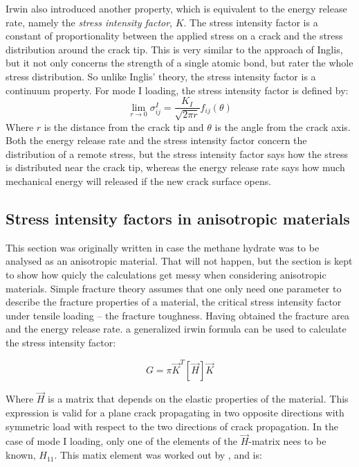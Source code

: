 Irwin also introduced another property, which is equivalent to the energy release rate, namely the \emph{stress intensity factor}, $K$. The stress intensity factor is a constant of proportionality between the applied stress on a crack and the stress distribution around the crack tip. This is very similar to the approach of Inglis, but it not only concerns the strength of a single atomic bond, but rater the whole stress distribution. So unlike Inglis' theory, the stress intensity factor is a continuum property. For mode I loading, the stress intensity factor is defined by:
\begin{equation}
	\lim_{r \to 0} \sigma_{ij}^I = \frac{K_I}{\sqrt{2\pi r}} f_{ij}(\theta)
\end{equation}
Where $r$ is the distance from the crack tip and $\theta$ is the angle from the crack axis. Both the energy release rate and the stress intensity factor concern the distribution of a remote stress, but the stress intensity factor says how the stress is distributed near the crack tip, whereas the energy release rate says how much mechanical energy will released if the new crack surface opens. 

\subsection{Stress intensity factors in anisotropic materials}
This section was originally written in case the methane hydrate was to be analysed as an anisotropic material. That will not happen, but the section is kept to show how quicly the calculations get messy when considering anisotropic materials. Simple fracture theory assumes that one only need one parameter to describe the fracture properties of a material, the critical stress intensity factor under tensile loading -- the fracture toughness. Having obtained the fracture area and the energy release rate. a generalized irwin formula can be used to calculate the stress intensity factor:

\begin{equation}
	G = \pi \vec{K}^T [\vec{H}] \vec{K} 
\end{equation}


Where $\vec{H}$ is a matrix that depends on the elastic properties of the material. This expression is valid for a plane crack propagating in two opposite directions with symmetric load with respect to the two directions of crack propagation. In the case of mode I loading, only one of the elements of the $\vec{H}$-matrix nees to be known, $H_{11}$. This matix element was worked out by \cite{Laubie2014}, and is:

